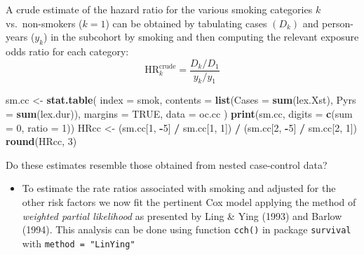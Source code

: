 \documentclass[
]{book}
\newenvironment{Shaded}{\begin{snugshade}}{\end{snugshade}}
\newcommand{\AttributeTok}[1]{\textcolor[rgb]{0.13,0.29,0.53}{#1}}
\newcommand{\ConstantTok}[1]{\textcolor[rgb]{0.56,0.35,0.01}{#1}}
\newcommand{\DecValTok}[1]{\textcolor[rgb]{0.00,0.00,0.81}{#1}}
\newcommand{\FunctionTok}[1]{\textcolor[rgb]{0.13,0.29,0.53}{\textbf{#1}}}
\newcommand{\NormalTok}[1]{#1}
\newcommand{\OtherTok}[1]{\textcolor[rgb]{0.56,0.35,0.01}{#1}}
\newcommand{\SpecialCharTok}[1]{\textcolor[rgb]{0.81,0.36,0.00}{\textbf{#1}}}
\providecommand{\tightlist}{%
  \setlength{\itemsep}{0pt}\setlength{\parskip}{0pt}}
\begin{document}
A crude estimate of the hazard ratio for the various smoking categories \(k\)
vs.~non-smokers (\(k=1\)) can be obtained by tabulating cases \((D_k)\) and person-years (\(y_k\))
in the subcohort by smoking and then computing the
relevant exposure odds ratio for each category:
\[ \text{HR}_k ^{\text{crude}} = \frac{D_k/D_1}{y_k/y_1} \]

\begin{Shaded}
\begin{Highlighting}[]
\NormalTok{sm.cc }\OtherTok{\textless{}{-}} \FunctionTok{stat.table}\NormalTok{(}
  \AttributeTok{index =}\NormalTok{ smok,}
  \AttributeTok{contents =} \FunctionTok{list}\NormalTok{(}\AttributeTok{Cases =} \FunctionTok{sum}\NormalTok{(lex.Xst), }\AttributeTok{Pyrs =} \FunctionTok{sum}\NormalTok{(lex.dur)),}
  \AttributeTok{margins =} \ConstantTok{TRUE}\NormalTok{, }
  \AttributeTok{data =}\NormalTok{ oc.cc}
\NormalTok{)}
\FunctionTok{print}\NormalTok{(sm.cc, }\AttributeTok{digits =} \FunctionTok{c}\NormalTok{(}\AttributeTok{sum =} \DecValTok{0}\NormalTok{, }\AttributeTok{ratio =} \DecValTok{1}\NormalTok{))}
\NormalTok{HRcc }\OtherTok{\textless{}{-}} 
\NormalTok{  (sm.cc[}\DecValTok{1}\NormalTok{, }\SpecialCharTok{{-}}\DecValTok{5}\NormalTok{] }\SpecialCharTok{/}\NormalTok{ sm.cc[}\DecValTok{1}\NormalTok{, }\DecValTok{1}\NormalTok{]) }\SpecialCharTok{/}\NormalTok{ (sm.cc[}\DecValTok{2}\NormalTok{, }\SpecialCharTok{{-}}\DecValTok{5}\NormalTok{] }\SpecialCharTok{/}\NormalTok{ sm.cc[}\DecValTok{2}\NormalTok{, }\DecValTok{1}\NormalTok{])}
\FunctionTok{round}\NormalTok{(HRcc, }\DecValTok{3}\NormalTok{)}
\end{Highlighting}
\end{Shaded}

Do these estimates resemble those obtained from nested case-control data?

\begin{itemize}
\tightlist
\item
  To estimate the rate ratios associated with smoking and adjusted for the
  other risk factors we now fit the pertinent Cox model
  applying the method of \emph{weighted partial likelihood} as
  presented by Ling \& Ying (1993) and Barlow (1994).
  This analysis can be done using function \texttt{cch()}
  in package \texttt{survival} with \texttt{method\ =\ "LinYing"}
\end{itemize}
\end{document}
